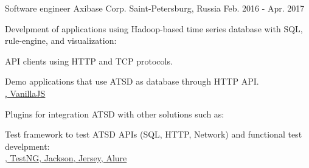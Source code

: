 

\begin{cventries}

  \cventry
    {Software engineer} %
    {Axibase Corp.} %
    {Saint-Petersburg, Russia} %
    {Feb. 2016 - Apr. 2017} %
    {
      \begin{cvitems} %
        \item {Develpment of applications using Hadoop-based time series database with SQL, rule-engine, and visualization:}
        \item {API clients using HTTP and TCP protocols.
          \\ \href{https://github.com/axibase/atsd-api-java}{\faGithubSquare\acvHeaderIconSep\@Java}
          \href{https://github.com/axibase/atsd-api-nodejs}{\faGithubSquare\acvHeaderIconSep\@NodeJS}
        }
        \item{ Demo applications that use ATSD as database through HTTP API.
          \\ \href{https://github.com/axibase/nodejs-dataslider}{\faGithubSquare\acvHeaderIconSep\@NodeJS, VanillaJS}
        }
        \item {Plugins for integration ATSD with other solutions such as:
         \\ \href{https://github.com/axibase/grafana-data-source}{\faGithubSquare\acvHeaderIconSep\@Graphana}
          \href{https://github.com/axibase/jmeter-time-window-backend-listener}{\faGithubSquare\acvHeaderIconSep\@JMeter}
          \href{https://github.com/getredash/redash/pull/1622}{\faGithubSquare\acvHeaderIconSep\@Redash}
        }
        \item { Test framework to test ATSD APIs (SQL, HTTP, Network) and functional test develpment:
         \\ \href{https://github.com/axibase/atsd-api-test}{\faGithubSquare\acvHeaderIconSep\@Java, TestNG, Jackson, Jersey, Alure}
}
\end{cvitems}}
\end{cventries}
